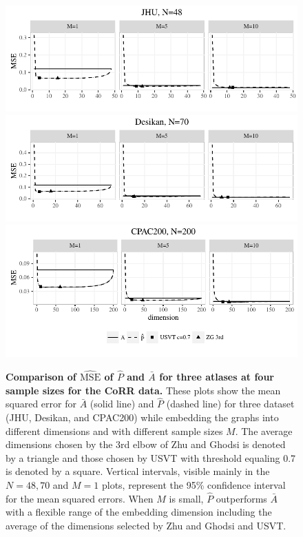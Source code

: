 \documentclass[10pt,letterpaper]{article}
\renewcommand{\hat}{\widehat}
\begin{document}
\begin{figure}[!htbp]
\centering
\includegraphics[width=.99\textwidth]{corr_data_MSE_jhu.pdf}\\
\includegraphics[width=.99\textwidth]{corr_data_MSE_desikan.pdf}\\
\includegraphics[width=.99\textwidth]{corr_data_MSE_CPAC200.pdf}
\caption{{\bf Comparison of $\hat{\mathrm{MSE}}$ of $\hat{P}$ and $\bar{A}$ for three atlases at four sample sizes for the CoRR data.}
These plots show the mean squared error for $\bar{A}$ (solid line) and $\hat{P}$ (dashed line) for three dataset (JHU, Desikan, and CPAC200) while embedding the graphs into different dimensions and with different sample sizes $M$. The average dimensions chosen by the 3rd elbow of Zhu and Ghodsi is denoted by a triangle
 and those chosen by USVT with threshold equaling 0.7 is denoted by a square.
 Vertical intervals, visible mainly in the $N=48,70$ and $M=1$ plots, represent the 95\% confidence interval for the mean squared errors.  When $M$ is small, $\hat{P}$ outperforms $\bar{A}$ with a flexible range of the embedding dimension including the average of the dimensions selected by Zhu and Ghodsi and USVT.}
\label{fig:realdata}
\end{figure}
\end{document}
